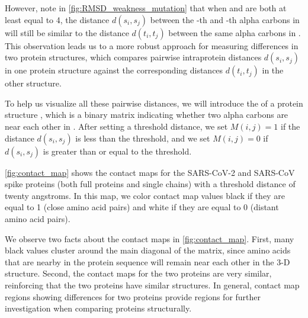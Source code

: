 However, note in \autoref{fig:RMSD_weakness_mutation}  that when  and  are both at least equal to 4, the distance $d(s_{i}, s_{j})$ between the -th and -th alpha carbons in  will still be similar to the distance $d(t_{i}, t_{j})$ between the same alpha carbons in . This observation leads us to a more robust approach for measuring differences in two protein structures, which compares  pairwise intraprotein distances $d(s_{i}, s_{j})$ in one protein structure against the corresponding distances $d(t_{i}, t_{j})$ in the other structure.

To help us visualize all these pairwise distances, we will introduce the  of a protein structure , which is a binary matrix indicating whether two alpha carbons are near each other in . After setting a threshold distance, we set $M(i, j) = 1$ if the distance $d(s_{i}, s_{j})$ is less than the threshold, and we set $M(i, j) = 0$ if $d(s_{i}, s_{j})$ is greater than or equal to the threshold.

\autoref{fig:contact_map} shows the contact maps for the SARS-CoV-2 and SARS-CoV spike proteins (both full proteins and single chains) with a threshold distance of twenty angstroms. In this map, we color contact map values black if they are equal to 1 (close amino acid pairs) and white if they are equal to 0 (distant amino acid pairs).\\

\begin{note}\end{note}

We observe two facts about the contact maps in \autoref{fig:contact_map}. First, many black values cluster around the main diagonal of the matrix, since amino acids that are nearby in the protein sequence will remain near each other in the 3-D structure. Second, the contact maps for the two proteins are very similar, reinforcing that the two proteins have similar structures. In general, contact map regions showing differences for two proteins provide regions for further investigation when comparing proteins structurally.\\

